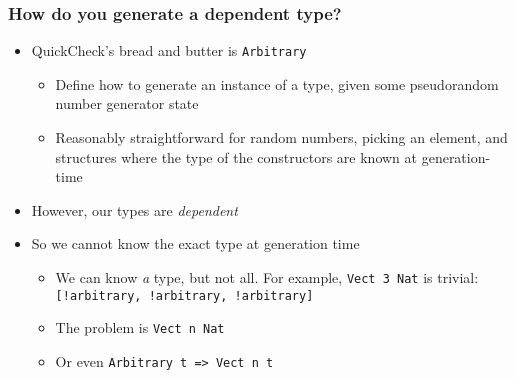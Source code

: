 \documentclass[compress,handout]{beamer}
\begin{document}
\begin{frame}
  \frametitle{How do you generate a dependent type?}

  \begin{itemize}
    \item<1-> QuickCheck's bread and butter is \texttt{Arbitrary}
    \begin{itemize}
      \item<2-> Define how to generate an instance of a type, given some
            pseudorandom number generator state
      \item<3-> Reasonably straightforward for random numbers, picking an
                element, and structures where the type of the constructors are
                known at generation-time
    \end{itemize}
    \item<3-> However, our types are \textit{dependent}
    \item<4-> So we cannot know the exact type at generation time
    \begin{itemize}
      \item<5-> We can know \textit{a} type, but not all. For example,
                \texttt{Vect 3 Nat} is trivial:
                \texttt{[!arbitrary, !arbitrary, !arbitrary]}
      \item<6-> The problem is\hspace*{2mm} \texttt{Vect n Nat}
      \item<7-> Or even\hspace*{2mm} \texttt{Arbitrary t => Vect n t}
    \end{itemize}
  \end{itemize}

\end{frame}
\end{document}
